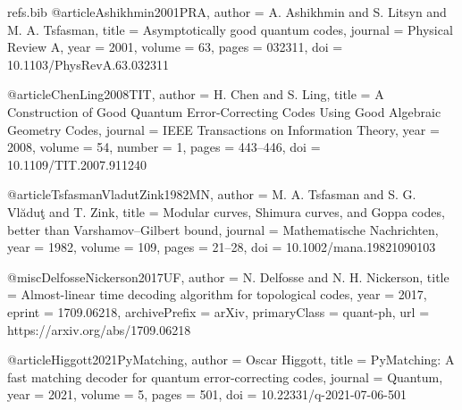 \begin{filecontents*}{refs.bib}
@article{Ashikhmin2001PRA,
  author    = {A. Ashikhmin and S. Litsyn and M. A. Tsfasman},
  title     = {Asymptotically good quantum codes},
  journal   = {Physical Review A},
  year      = {2001},
  volume    = {63},
  pages     = {032311},
  doi       = {10.1103/PhysRevA.63.032311}
}

@article{ChenLing2008TIT,
  author    = {H. Chen and S. Ling},
  title     = {A Construction of Good Quantum Error-Correcting Codes Using Good Algebraic Geometry Codes},
  journal   = {IEEE Transactions on Information Theory},
  year      = {2008},
  volume    = {54},
  number    = {1},
  pages     = {443--446},
  doi       = {10.1109/TIT.2007.911240}
}

@article{TsfasmanVladutZink1982MN,
  author    = {M. A. Tsfasman and S. G. Vl{\u a}du{\c t} and T. Zink},
  title     = {Modular curves, Shimura curves, and Goppa codes, better than Varshamov--Gilbert bound},
  journal   = {Mathematische Nachrichten},
  year      = {1982},
  volume    = {109},
  pages     = {21--28},
  doi       = {10.1002/mana.19821090103}
}

@misc{DelfosseNickerson2017UF,
  author    = {N. Delfosse and N. H. Nickerson},
  title     = {Almost-linear time decoding algorithm for topological codes},
  year      = {2017},
  eprint    = {1709.06218},
  archivePrefix = {arXiv},
  primaryClass  = {quant-ph},
  url       = {https://arxiv.org/abs/1709.06218}
}

@article{Higgott2021PyMatching,
  author    = {Oscar Higgott},
  title     = {PyMatching: A fast matching decoder for quantum error-correcting codes},
  journal   = {Quantum},
  year      = {2021},
  volume    = {5},
  pages     = {501},
  doi       = {10.22331/q-2021-07-06-501}
}
\end{filecontents*}
\documentclass[conference]{IEEEtran}

\usepackage[utf8]{inputenc}
\usepackage[T1]{fontenc}
\usepackage{cite}
\usepackage{amsmath,amssymb}
\usepackage{siunitx}
\usepackage{graphicx}
\usepackage[ruled,vlined]{algorithm2e}
\usepackage{booktabs}
\usepackage{xcolor}
\usepackage{enumitem}
\usepackage{adjustbox}
\usepackage{xspace}
\usepackage[hidelinks]{hyperref}

\DeclareSIUnit{}
\DeclareSIUnit{}
\DeclareSIUnit{}

